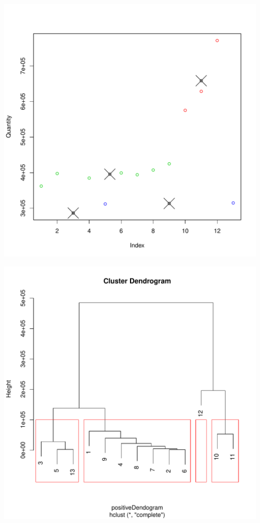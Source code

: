 \documentclass[conference]{IEEEtran}\usepackage[]{graphicx}\usepackage[]{color}
\makeatletter
\def\maxwidth{ %
  \ifdim\Gin@nat@width>\linewidth
    \linewidth
  \else
    \Gin@nat@width
  \fi
}
\newenvironment{knitrout}{}{} %
\makeatother
\begin{document}
\begin{knitrout}
\color{fgcolor}
\includegraphics[width=\maxwidth]{figure/kmeans-1} 

\includegraphics[width=\maxwidth]{figure/kmeans-2} 

\end{knitrout}
\end{document}
